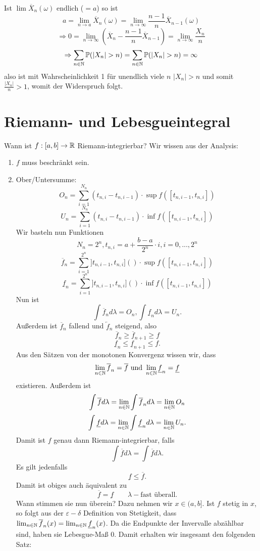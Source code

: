 			\begin{bew}
				Ist $\lim\overline{X}_n(\omega)$ endlich ($=a$) so ist
				\[ a=\lim_{n\to a}\overline{X}_n(\omega)=\lim_{n\to\infty}\frac{n-1}{n}\overline{X}_{n-1}(\omega) \]
				\[ \Rightarrow 0=\lim_{n\to\infty}\left(\overline{X}_n-\frac{n-1}{n}\overline{X}_{n-1}\right)=\lim_{n\to\infty}\frac{X_n}{n}\]
				\[ \Rightarrow \sum_{n\in\N}\P(|X_n|>n)=\sum_{n\in\N}\P(|X_n|>n)=\infty \]
				also ist mit Wahrscheinlichkeit 1 für unendlich viele $n$ $|X_n|>n$ und somit $\frac{|X_n|}{n}>1$, womit der Widerspruch folgt. 
			\end{bew}
			
			
		\section{Riemann- und Lebesgueintegral}
			\begin{bem}
			Wann ist $f:[a,b]\to\mathbb{R}$ Riemann-integrierbar? Wir wissen aus der Analysis:
			\begin{enumerate} [(1)]
				\item $f$ muss beschränkt sein.
				\item Ober/Untersumme:
					\[ O_n=\sum_{i=1}^{N_n} (t_{n,i}-t_{n,i-1})\cdot\sup f([t_{n,i-1},t_{n,i}]) \]
					\[ U_n=\sum_{i=1}^{N_n} (t_{n,i}-t_{n,i-1})\cdot\inf f([t_{n,i-1},t_{n,i}]) \]
					Wir basteln nun Funktionen 
					\[N_n=2^n, t_{n,i}=a+\frac{b-a}{2^n}\cdot i, i=0,...,2^n\]
					\[ \overline{f}_n=\sum_{i=1}^{2^n} ]t_{n,i-1},t_{n,i}]()\cdot \sup f([t_{n,i-1}, t_{n,i}]) \]
					\[ \underline{f}_n=\sum_{i=1}^{2^n} ]t_{n,i-1},t_{n,i}]()\cdot \inf f([t_{n,i-1}, t_{n,i}]) \]
					Nun ist 
					\[ \int \overline{f}_nd\lambda= O_n, \int\underline{f}_nd\lambda=U_n. \]
					Außerdem ist $\overline{f}_n$ fallend und $\underleftarrow{f}_n$ steigend, also 
					\[\overline{f}_n\ge \overline{f}_{n+1}\ge f\]
					\[ \underline{f}_n\le \underline{f}_{n+1}\le f.\]
					Aus den Sätzen von der monotonen Konvergenz wissen wir, dass 
					\[ \lim_{n\in\mathbb{N}} \overline{f}_n=\overline{f} \text{   und   }\lim_{n\in\mathbb{N}} \underline{f}_n=\underline{f}\]
					existieren. Außerdem ist 
					\[ \int \overline{f}d\lambda=\lim_{n\in\mathbb{N}} \int\overline{f}_nd\lambda=\lim_{n\in\mathbb{N}} O_n \]
					\[ \int \underline{f}d\lambda=\lim_{n\in\mathbb{N}}\int \underline{f}_nd\lambda=\lim_{n\in\mathbb{N}} U_n. \]
					Damit ist $f$ genau dann Riemann-integrierbar, falls
					\[ \int \overline{f}d\lambda=\int \overline{f}d\lambda. \]
					Es gilt jedenfalls
					\[ \underline{f}\le\overline{f}. \]
					Damit ist obiges auch äquivalent zu 
					\[ \overline{f}=\underline{f} \qquad \lambda-\text{fast überall.} \]
					Wann stimmen sie nun überein? Dazu nehmen wir $x\in(a,b]$. Ist $f$ stetig in $x$, so folgt aus der $\varepsilon-\delta$ Definition von Stetigkeit, dass $\lim_{n\in\mathbb{N}} \overline{f}_n(x)=\lim_{n\in\mathbb{N}}\underline{f}_n(x)$. Da die Endpunkte der Invervalle abzählbar sind, haben sie Lebesgue-Maß 0. Damit erhalten wir insgesamt den folgenden Satz:
			\end{enumerate}
		\end{bem}
		
